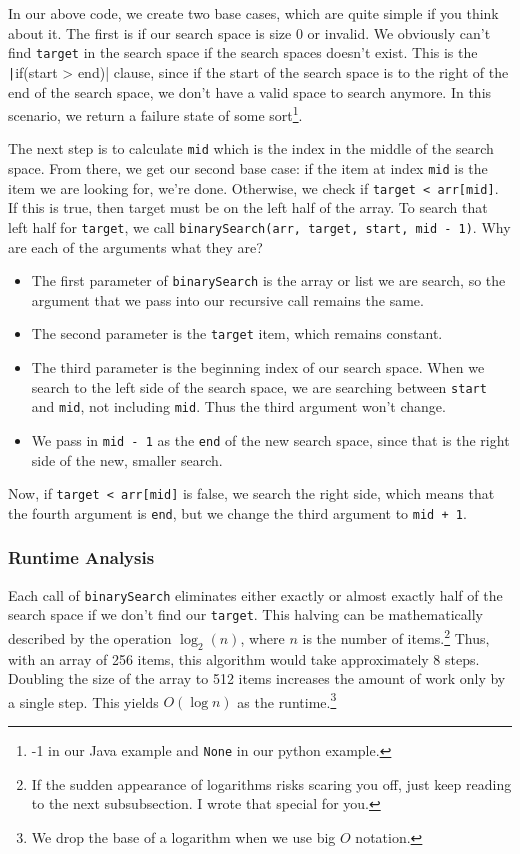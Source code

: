 In our above code, we create two base cases, which are quite simple if you think about it.  The first is if our search space is size 0 or invalid.  We obviously can't find \texttt{target} in the search space if the search spaces doesn't exist. This is the \texttt|if(start > end)| clause, since if the start of the search space is to the right of the end of the search space, we don't have a valid space to search anymore.  In this scenario, we return a failure state of some sort\footnote{-1 in our Java example and \texttt{None} in our python example.}.  

The next step is to calculate \texttt{mid} which is the index in the middle of the search space.  From there, we get our second base case:  if the item at index \texttt{mid} is the item we are looking for, we're done.   Otherwise, we check if \texttt{target < arr[mid]}.  If this is true, then target must be on the left half of the array.  To search that left half for \texttt{target}, we call \texttt{binarySearch(arr, target, start, mid - 1)}.    Why are each of the arguments what they are?

\begin{itemize}
	\item The first parameter of \texttt{binarySearch} is the array or list we are search, so the argument that we pass into our recursive call remains the same.
	\item The second parameter is the \texttt{target} item, which remains constant.
	\item The third parameter is the beginning index of our search space.  When we search to the left side of the search space, we are searching between \texttt{start} and \texttt{mid}, not including \texttt{mid}.  Thus the third argument won't change.
	\item We pass in \texttt{mid - 1} as the \texttt{end} of the new search space, since that is the right side of the new, smaller search.
\end{itemize}


Now, if  \texttt{target < arr[mid]} is false, we search the right side, which means that the fourth argument is \texttt{end}, but we change the third argument to \texttt{mid + 1}.




\subsubsection{Runtime Analysis}
Each call of \texttt{binarySearch} eliminates either exactly or almost exactly half of the search space if we don't find our \texttt{target}.  This halving can be mathematically  described by the operation $\log_2(n)$, where $n$ is the number of items.\footnote{If the sudden appearance of logarithms risks scaring you off, just keep reading to the next subsubsection.  I wrote that special for you.}  Thus, with an array of 256 items, this algorithm would take approximately 8 steps. Doubling the size of the array to 512 items increases the amount of work only by a single step. This yields $O(\log n)$  as the runtime.\footnote{ We drop the base of a logarithm when we use big $O$ notation.}    
 

